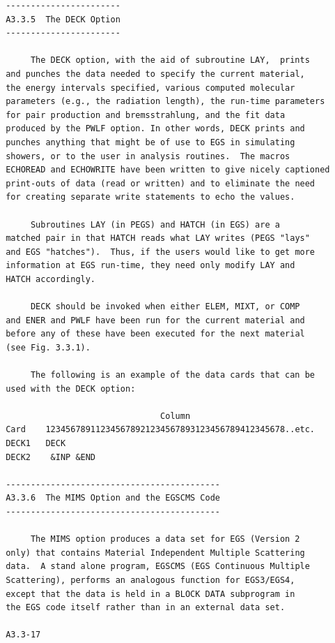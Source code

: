 \newpage {} \begin{verbatim}
 -----------------------
 A3.3.5  The DECK Option
 -----------------------

      The DECK option, with the aid of subroutine LAY,  prints
 and punches the data needed to specify the current material,
 the energy intervals specified, various computed molecular
 parameters (e.g., the radiation length), the run-time parameters
 for pair production and bremsstrahlung, and the fit data
 produced by the PWLF option. In other words, DECK prints and
 punches anything that might be of use to EGS in simulating
 showers, or to the user in analysis routines.  The macros
 ECHOREAD and ECHOWRITE have been written to give nicely captioned
 print-outs of data (read or written) and to eliminate the need
 for creating separate write statements to echo the values.

      Subroutines LAY (in PEGS) and HATCH (in EGS) are a
 matched pair in that HATCH reads what LAY writes (PEGS "lays"
 and EGS "hatches").  Thus, if the users would like to get more
 information at EGS run-time, they need only modify LAY and
 HATCH accordingly.

      DECK should be invoked when either ELEM, MIXT, or COMP
 and ENER and PWLF have been run for the current material and
 before any of these have been executed for the next material
 (see Fig. 3.3.1).

      The following is an example of the data cards that can be
 used with the DECK option:

                                Column
 Card    123456789112345678921234567893123456789412345678..etc.
 DECK1   DECK
 DECK2    &INP &END

 -------------------------------------------
 A3.3.6  The MIMS Option and the EGSCMS Code
 -------------------------------------------

      The MIMS option produces a data set for EGS (Version 2
 only) that contains Material Independent Multiple Scattering
 data.  A stand alone program, EGSCMS (EGS Continuous Multiple
 Scattering), performs an analogous function for EGS3/EGS4,
 except that the data is held in a BLOCK DATA subprogram in
 the EGS code itself rather than in an external data set.

 A3.3-17
\end{verbatim}
